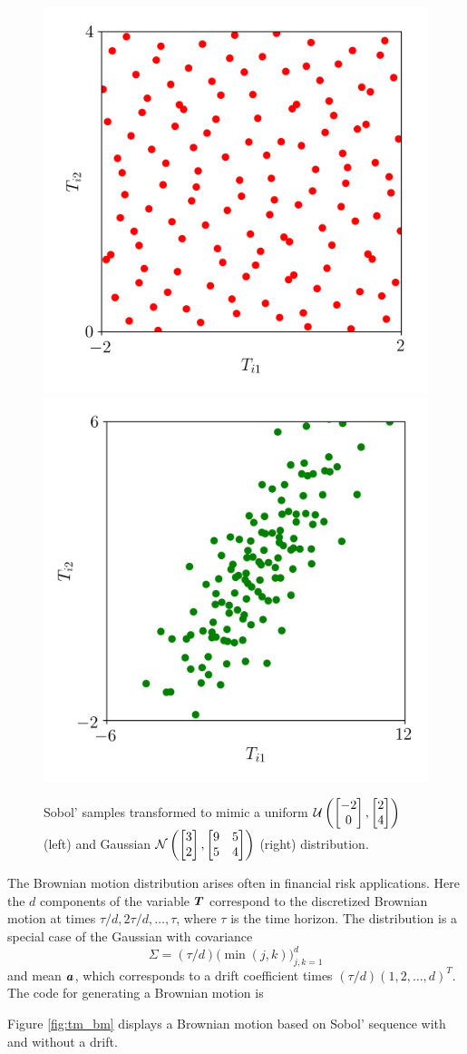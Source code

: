 \documentclass[graybox,footinfo]{svmult}
\newcommand{\mSigma}{\mathsf{\Sigma}}
\begin{document}
\begin{figure}[t]
	\includegraphics[width=.45\textwidth]{QMCSoftwareArticle/figs/tm_uniform.png} 
	\includegraphics[width=.45\textwidth]{QMCSoftwareArticle/figs/tm_gaussian.png}
	\caption{Sobol' samples transformed to mimic a uniform ${\mathcal{U}}\left(\begin{bmatrix} -2 \\ 0 \end{bmatrix}, \begin{bmatrix} 2 \\ 4 \end{bmatrix} \right)$ (left) and  Gaussian ${\mathcal{N}}\left(\begin{bmatrix} 3 \\ 2 \end{bmatrix}, \begin{bmatrix} 9 & 5 \\ 5 & 4 \end{bmatrix} \right)$ (right) distribution.}
	\label{fig:tm_ug}
\end{figure}

The Brownian motion distribution arises often in financial risk applications.  Here the $d$ components of the variable ${\boldsymbol{T}}$ correspond to the discretized Brownian motion at times $\tau/d, 2\tau/d, \ldots, \tau$, where $\tau$ is the time horizon.  The distribution is a special case of the Gaussian with covariance 
\begin{equation} \label{eq:BMcov}
	\mSigma = (\tau/d) \bigl (\min(j,k) \bigr)_{j,k=1}^d
\end{equation}
and mean ${\boldsymbol{a}}$, which  corresponds to a drift coefficient times $(\tau/d)(1, 2, \ldots, d)^T$. The code for generating a Brownian motion is

Figure \ref{fig:tm_bm} displays a Brownian motion based on Sobol' sequence with and without a drift.
\end{document}
